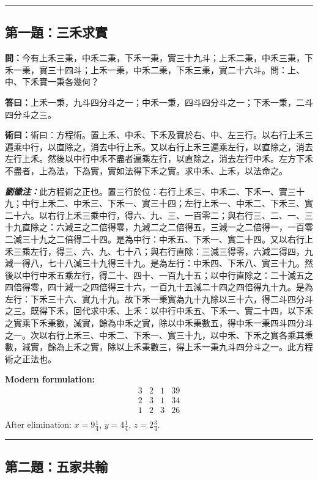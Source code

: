 \documentclass[11pt,a4paper]{article}
\newcommand{\wen}[1]{\textbf{\color{problemcolor}問：}#1\par}
\newcommand{\da}[1]{\textbf{答曰：}#1\par}
\newcommand{\shu}[1]{\textbf{術曰：}#1\par}
\newcommand{\liuhui}[1]{{\color{commentarycolor}\textit{\textbf{劉徽注：}}#1\par}}
\begin{document}
\bigskip
\hrule
\bigskip

\subsection{第一題：三禾求實}

\wen{今有上禾三秉，中禾二秉，下禾一秉，實三十九斗；上禾二秉，中禾三秉，下禾一秉，實三十四斗；上禾一秉，中禾二秉，下禾三秉，實二十六斗。問：上、中、下禾實一秉各幾何？}

\da{上禾一秉，九斗四分斗之一；中禾一秉，四斗四分斗之一；下禾一秉，二斗四分斗之三。}

\shu{術曰：方程術。置上禾、中禾、下禾及實於右、中、左三行。以右行上禾三遍乘中行，以直除之，消去中行上禾。又以右行上禾三遍乘左行，以直除之，消去左行上禾。然後以中行中禾不盡者遍乘左行，以直除之，消去左行中禾。左方下禾不盡者，上為法，下為實，實如法得下禾之實。求中禾、上禾，以法命之。}

\liuhui{此方程術之正也。置三行於位：右行上禾三、中禾二、下禾一、實三十九；中行上禾二、中禾三、下禾一、實三十四；左行上禾一、中禾二、下禾三、實二十六。以右行上禾三乘中行，得六、九、三、一百零二；與右行三、二、一、三十九直除之：六減三之二倍得零，九減二之二倍得五，三減一之二倍得一，一百零二減三十九之二倍得二十四。是為中行：中禾五、下禾一、實二十四。又以右行上禾三乘左行，得三、六、九、七十八；與右行直除：三減三得零，六減二得四，九減一得八，七十八減三十九得三十九。是為左行：中禾四、下禾八、實三十九。然後以中行中禾五乘左行，得二十、四十、一百九十五；以中行直除之：二十減五之四倍得零，四十減一之四倍得三十六，一百九十五減二十四之四倍得九十九。是為左行：下禾三十六、實九十九。故下禾一秉實為九十九除以三十六，得二斗四分斗之三。既得下禾，回代求中禾、上禾：以中行中禾五、下禾一、實二十四，以下禾之實乘下禾秉數，減實，餘為中禾之實，除以中禾秉數五，得中禾一秉四斗四分斗之一。次以右行上禾三、中禾二、下禾一、實三十九，以中禾、下禾之實各乘其秉數，減實，餘為上禾之實，除以上禾秉數三，得上禾一秉九斗四分斗之一。此方程術之正法也。}

\textbf{Modern formulation:}
\[
\begin{array}{ccc|c}
3 & 2 & 1 & 39 \\
2 & 3 & 1 & 34 \\
1 & 2 & 3 & 26 \\
\end{array}
\]
After elimination: $x = 9\frac{1}{4}$, $y = 4\frac{1}{4}$, $z = 2\frac{3}{4}$.

\bigskip
\hrule
\bigskip

\subsection{第二題：五家共輸}
\end{document}

